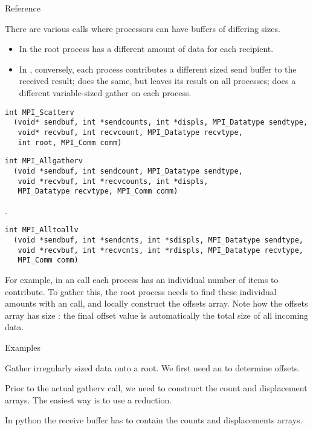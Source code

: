  {Reference}

There are various calls where processors can have
buffers of differing sizes.
\begin{itemize}
\item In  the root process has a different
  amount of data for each recipient.
\item In , conversely, each process
  contributes a different sized send buffer to the received result;
   does the same, but leaves its result
  on all processes;  does a different
  variable-sized gather on each process.
\end{itemize}

\begin{verbatim}
int MPI_Scatterv
  (void* sendbuf, int *sendcounts, int *displs, MPI_Datatype sendtype, 
   void* recvbuf, int recvcount, MPI_Datatype recvtype, 
   int root, MPI_Comm comm)
\end{verbatim}


\begin{verbatim}
int MPI_Allgatherv
  (void *sendbuf, int sendcount, MPI_Datatype sendtype, 
   void *recvbuf, int *recvcounts, int *displs, 
   MPI_Datatype recvtype, MPI_Comm comm)
\end{verbatim}

.
\begin{verbatim}
int MPI_Alltoallv
  (void *sendbuf, int *sendcnts, int *sdispls, MPI_Datatype sendtype, 
   void *recvbuf, int *recvcnts, int *rdispls, MPI_Datatype recvtype,
   MPI_Comm comm)
\end{verbatim}

For example, in an  call each process has an individual
number of items to contribute. To gather this, the root process needs
to find these individual amounts with an  call, and
locally construct the offsets array. Note how the offsets array has
size : the final offset value is automatically the total
size of all incoming data.  
%

 {Examples}


Gather irregularly sized data onto a root. We first need an
 to determine offsets.
%
%


Prior to the actual gatherv call, we need to construct the count and
displacement arrays. The easiest way is to use a reduction.


In python the receive buffer has to contain the counts and
displacements arrays.


